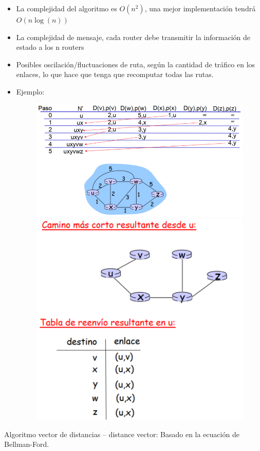 \documentclass[12pt, twoside, openright]{report} %
\begin{document}
\begin{itemize}
    \item
      La complejidad del algoritmo es \(O(n^2)\), una mejor
      implementación tendrá \(O(n \log (n))\)
    \item
      La complejidad de mensaje, cada router debe transmitir la
      información de estado a los n routers
    \item
      Posibles oscilación/fluctuaciones de ruta, según la cantidad de
      tráfico en los enlaces, lo que hace que tenga que recomputar todas
      las rutas.
    \item
      Ejemplo:
	  \begin{figure}[H]
		{\includegraphics[scale=.35]{Untitled 40.png}\includegraphics[scale=.35]{Untitled 41.png}}
	\end{figure}

    \end{itemize}
\pagebreak
	Algoritmo vector de distancias -- distance vector: Basado en la
    ecuación de Bellman-Ford.
\end{document}
